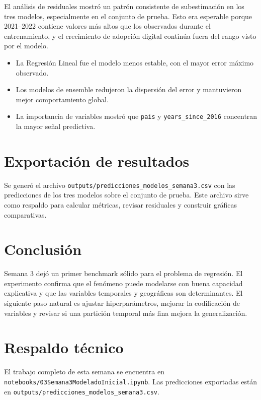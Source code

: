 \documentclass[12pt,a4paper]{article}
\begin{document}
El análisis de residuales mostró un patrón consistente de subestimación en los tres modelos, especialmente en el conjunto de prueba. Esto era esperable porque 2021--2022 contiene valores más altos que los observados durante el entrenamiento, y el crecimiento de adopción digital continúa fuera del rango visto por el modelo.

\begin{itemize}
    \item La Regresión Lineal fue el modelo menos estable, con el mayor error máximo observado.
    \item Los modelos de ensemble redujeron la dispersión del error y mantuvieron mejor comportamiento global.
    \item La importancia de variables mostró que \texttt{pais} y \texttt{years\_since\_2016} concentran la mayor señal predictiva.
\end{itemize}

\section{Exportación de resultados}

Se generó el archivo \texttt{outputs/predicciones\_modelos\_semana3.csv} con las predicciones de los tres modelos sobre el conjunto de prueba. Este archivo sirve como respaldo para calcular métricas, revisar residuales y construir gráficas comparativas.

\section{Conclusión}

Semana 3 dejó un primer benchmark sólido para el problema de regresión. El experimento confirma que el fenómeno puede modelarse con buena capacidad explicativa y que las variables temporales y geográficas son determinantes. El siguiente paso natural es ajustar hiperparámetros, mejorar la codificación de variables y revisar si una partición temporal más fina mejora la generalización.

\section{Respaldo técnico}

El trabajo completo de esta semana se encuentra en \texttt{notebooks/03Semana3ModeladoInicial.ipynb}. Las predicciones exportadas están en \texttt{outputs/predicciones\_modelos\_semana3.csv}.
\end{document}
